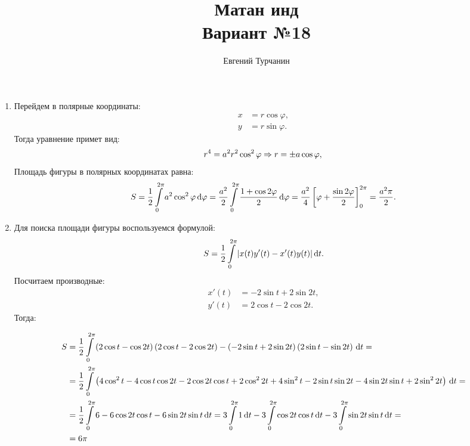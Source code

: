 \documentclass{report}
\title{\Huge{Матан инд}\\ Вариант №18}
\author{\huge{Евгений Турчанин}}
\date{}
\begin{document}
\maketitle
{}
\sol

\begin{enumerate}
\item Перейдем в полярные координаты:
\begin{align*}
    x &= r\cos\varphi, \\
    y &= r\sin\varphi.
\end{align*}
Тогда уравнение примет вид:
\[
    r^4 = a^2r^2\cos^2\varphi \Rightarrow r = \pm a\cos\varphi, \\
\]
Площадь фигуры в полярных координатах равна:
\[
    S = \frac{1}{2}\int\limits_{0}^{2\pi}a^2\cos^2\varphi \dl \varphi = \frac{a^2}{2}\int\limits_{0}^{2\pi}\frac{1+\cos 2\varphi}{2}\dl \varphi = \frac{a^2}{4}\left[\varphi + \frac{\sin 2\varphi}{2}\right]_0^{2\pi} = \frac{a^2\pi}{2}.
\]
\item Для поиска площади фигуры воспользуемся формулой:
\[
    S = \frac{1}{2}\int\limits_{0}^{2\pi}|x(t)y'(t) - x'(t)y(t)|\dl t.
\] 
Посчитаем производные:
\begin{align*}
    x'(t) &= -2\sin t + 2\sin 2t, \\
    y'(t) &= 2\cos t - 2\cos 2t.
\end{align*}
Тогда:

\begin{align*}
    S &= \frac{1}{2}\int\limits_{0}^{2\pi}\left(2\cos t-\cos 2t\right)\left(2\cos t - 2\cos 2t\right) - \left(-2\sin t + 2\sin 2t\right)\left(2\sin t - \sin 2t\right)\dl t =\\
    &= \frac{1}{2}\int\limits_{0}^{2\pi}\left(4\cos^2 t - 4\cos t\cos 2t - 2\cos 2t\cos t + 2\cos^2 2t + 4\sin^2 t - 2\sin t\sin 2t - 4\sin 2t\sin t + 2\sin^2 2t\right)\dl t =\\
    &= \frac{1}{2}\int\limits_{0}^{2\pi}6-6\cos 2t \cos t-6\sin 2t \sin t \dl t = 3\int\limits_{0}^{2\pi}1\dl t - 3\int\limits_{0}^{2\pi}\cos 2t \cos t \dl t - 3\int\limits_{0}^{2\pi}\sin 2t \sin t \dl t =\\
    &= 6\pi
\end{align*}
\end{enumerate}
\end{document}

